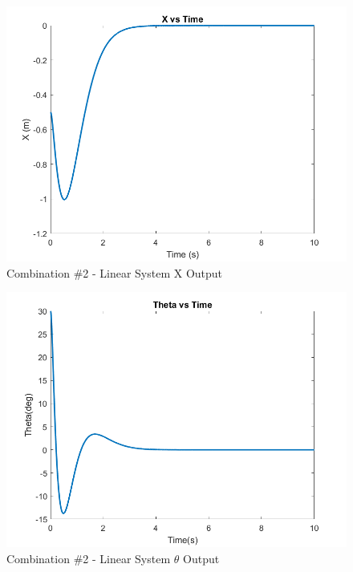 \begin{figure}[!ht]
    \centering
    \includegraphics[width=\linewidth]{figs/sf_lin_c2_x.png}
    \caption{Combination $\#$2 - Linear System X Output}
    \label{}
\end{figure}

\begin{figure}[!ht]
    \centering
    \includegraphics[width=\linewidth]{figs/sf_lin_c2_theta.png}
    \caption{Combination $\#$2 - Linear System $\theta$ Output}
    \label{}
\end{figure}

